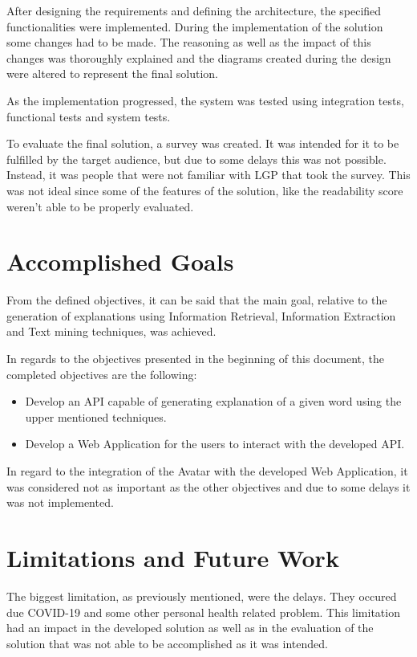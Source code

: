 After designing the requirements and defining the architecture, the specified functionalities were implemented.
During the implementation of the solution some changes had to be made.
The reasoning as well as the impact of this changes was thoroughly explained and the diagrams created during the design were altered to represent the final solution.

As the implementation progressed, the system was tested using integration tests, functional tests and system tests.

To evaluate the final solution, a survey was created.
It was intended for it to be fulfilled by the target audience, but due to some delays this was not possible.
Instead, it was people that were not familiar with \gls{LGP} that took the survey.
This was not ideal since some of the features of the solution, like the readability score weren't able to be properly evaluated.

\section{Accomplished Goals}

From the defined objectives, it can be said that the main goal, relative to the generation of explanations using Information Retrieval, Information Extraction and Text mining techniques, was achieved.

In regards to the objectives presented in the beginning of this document, the completed objectives are the following:
\begin{itemize}
        \item Develop an API capable of generating explanation of a given word using the upper mentioned techniques.
        \item Develop a Web Application for the users to interact with the developed API.
\end{itemize}

In regard to the integration of the Avatar with the developed Web Application, it was considered not as important as the other objectives and due to some delays it was not implemented.

\section{Limitations and Future Work}

The biggest limitation, as previously mentioned, were the delays.
They occured due COVID-19 and some other personal health related problem.
This limitation had an impact in the developed solution as well as in the evaluation of the solution that was not able to be accomplished as it was intended.

